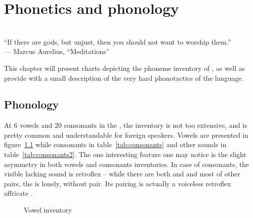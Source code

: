 \chapter{Phonetics and phonology}
\label{ch:phonetics}

\begin{flushright}\small
    \\
    ``If there are gods, but unjust, then you should not want to worship them.''\\
    --- Marcus Aurelius, ``Meditations''
\end{flushright}\bigskip

This chapter will present charts depicting the phoneme inventory of \andro, as
well as provide with a small description of the very hard phonotactics of the
language.

\section{Phonology}

At 6 vowels and 20 consonants in the , the inventory is not
too extensive, and is pretty common and understandable for foreign speakers.
Vowels are presented in figure~\ref{fig:vowels} while consonants in
table~\ref{tab:consonants} and other sounds in table~\ref{tab:consonants2}. The
one interesting feature one may notice is the slight asymmetry in both vowels
and consonants inventories. In case of consonants, the visible lacking sound is
retroflex  -- while there are both  and  and most of other
pairs, the  is lonely, without pair. Its pairing is actually a voiceless
retroflex affricate .

\begin{figure}
    \begin{center}
        {\Large
            \begin{vowel}
            \end{vowel}
        }
    \end{center}
    \label{fig:vowels}
    \caption{Vowel inventory}
\end{figure}

